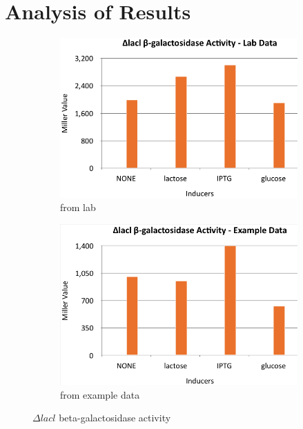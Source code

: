\documentclass{article}
\begin{document}
\section{Analysis of Results}
\begin{figure}[htp]
\centering
\begin{subfigure}{.5\textwidth}
  \centering
  \includegraphics[width=1\linewidth]{lacl_lab.png}
	\caption{from lab}
	\label{fig:lacl_lab}
\end{subfigure}%
\begin{subfigure}{.5\textwidth}
  \centering
  \includegraphics[width=1\linewidth]{lacl_exp.png}
  \caption{from example data}
  \label{fig:lacl_exp}
\end{subfigure}
\caption{$\Delta lacl$ beta-galactosidase activity}
\label{fig:lacl}
\end{figure}
\end{document}
